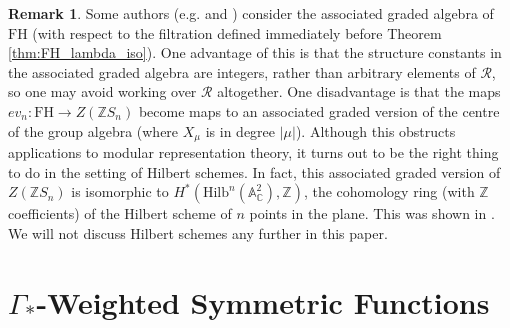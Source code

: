 \documentclass[10pt]{article}
\theoremstyle{definition}
\newtheorem{remark}[theorem]{Remark}
\newcommand{\FH}{\mathrm{FH}}
\begin{document}
\begin{remark}
Some authors (e.g. \cite{Wang1} and \cite[Example 25, Section 1.7]{Macdonald}) consider the associated graded algebra of $\FH$ (with respect to the filtration defined immediately before Theorem \ref{thm:FH_lambda_iso}). One advantage of this is that the structure constants in the associated graded algebra are integers, rather than arbitrary elements of $\mathcal{R}$, so one may avoid working over $\mathcal{R}$ altogether. One disadvantage is that the maps $ev_n: \FH \to Z(\mathbb{Z}S_n)$ become maps to an associated graded version of the centre of the group algebra (where $X_\mu$ is in degree $|\mu|$). Although this obstructs applications to modular representation theory, it turns out to be the right thing to do in the setting of Hilbert schemes. In fact, this associated graded version of $Z(\mathbb{Z}S_n)$ is isomorphic to $H^*(\mathrm{Hilb}^n(\mathbb{A}_{\mathbb{C}}^2), \mathbb{Z})$, the cohomology ring (with $\mathbb{Z}$ coefficients) of the Hilbert scheme of $n$ points in the plane. This was shown in \cite{LehnSorger}. We will not discuss Hilbert schemes any further in this paper.
\end{remark}




\section{\texorpdfstring{$\Gamma_*$}{Gamma}-Weighted Symmetric Functions} \label{LambdaG_section}
\end{document}

